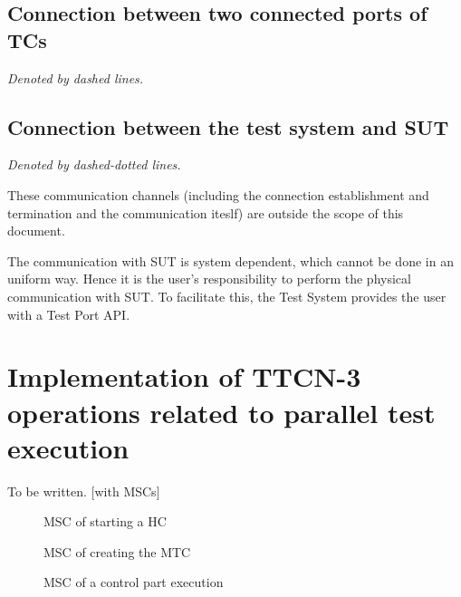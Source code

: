 \documentclass[a4paper,10pt]{article}
\begin{document}
\subsection{Connection between two connected ports of TCs}

\emph{Denoted by dashed lines.}

\subsection{Connection between the test system and SUT}

\emph{Denoted by dashed-dotted lines.}

These communication channels (including the connection establishment and termination and the communication iteslf) are outside the scope of this document.

The communication with SUT is system dependent, which cannot be done in an uniform way. Hence it is the user's responsibility to perform the physical communication with SUT. To facilitate this, the Test System provides the user with a Test Port API.

\newpage

\section{Implementation of TTCN-3 operations related to parallel test execution}

To be written. [with MSCs]

\begin{figure}[!p]
\begin{center}
{}
\end{center}
\caption{\label{figure:starting_HC}MSC of starting a HC}
\end{figure}

\begin{figure}[!p]
\begin{center}
{}
\end{center}
\caption{\label{figure:creating_MTC}MSC of creating the MTC}
\end{figure}

\begin{figure}[!p]
\begin{center}
{}
\end{center}
\caption{\label{figure:executing_control}MSC of a control part execution}
\end{figure}
\end{document}
